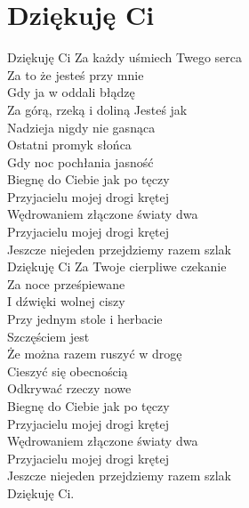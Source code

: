 \section{Dziękuję Ci}
\begin{text}
    Dziękuję Ci Za każdy uśmiech Twego serca\\
    Za to że jesteś przy mnie\\
    Gdy ja w oddali błądzę\\
    Za górą, rzeką i doliną Jesteś jak\\
    Nadzieja nigdy nie gasnąca\\
    Ostatni promyk słońca\\
    Gdy noc pochłania jasność\\
    Biegnę do Ciebie jak po tęczy\\
    Przyjacielu mojej drogi krętej\\
    Wędrowaniem złączone światy dwa\\
    Przyjacielu mojej drogi krętej\\
    Jeszcze niejeden przejdziemy razem szlak\\
    Dziękuję Ci Za Twoje cierpliwe czekanie\\
    Za noce prześpiewane\\
    I dźwięki wolnej ciszy\\
    Przy jednym stole i herbacie\\
    Szczęściem jest\\
    Że można razem ruszyć w drogę\\
    Cieszyć się obecnością\\
    Odkrywać rzeczy nowe\\
    Biegnę do Ciebie jak po tęczy\\
    Przyjacielu mojej drogi krętej\\
    Wędrowaniem złączone światy dwa\\
    Przyjacielu mojej drogi krętej\\
    Jeszcze niejeden przejdziemy razem szlak\\
    Dziękuję Ci.
\end{text}